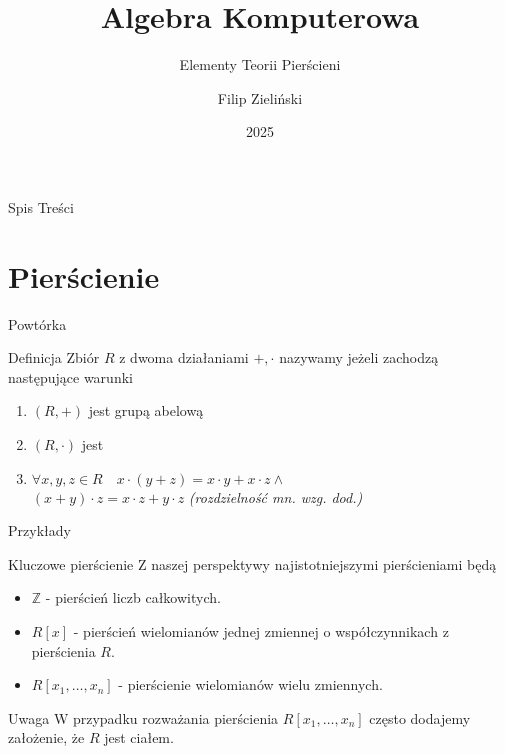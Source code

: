 \documentclass{beamer}
\title{Algebra Komputerowa}
\subtitle{Elementy Teorii Pierścieni}
\author{Filip Zieli\'nski}
\date{2025}
\begin{document}
\begin{frame}
    \titlepage
\end{frame}
 
\begin{frame}{Spis Treści}
    \tableofcontents
\end{frame}

\section{Pierścienie}
\begin{frame}{Powtórka}
    \begin{block}{Definicja}
        Zbiór $R$ z dwoma działaniami $+, \cdot$ nazywamy    jeżeli zachodzą następujące warunki
        \begin{enumerate}
            \item $(R, +)$ jest grupą abelową 
            \item $(R, \cdot)$ jest   
            \item $\forall x,y,z \in R \quad x \cdot (y + z) = x \cdot y + x \cdot z \land $ \\ $(x + y) \cdot z = x \cdot z + y \cdot z$ \hfill \textit{(rozdzielność mn. wzg. dod.)} 
        \end{enumerate}
    \end{block}
\end{frame}

\begin{frame}{Przykłady}
    \begin{exampleblock}{Kluczowe pierścienie}
        Z naszej perspektywy najistotniejszymi pierścieniami będą
        \begin{itemize}
            \item $\mathbb{Z}$ - pierścień liczb całkowitych.
            \item $R[x]$ - pierścień wielomianów jednej zmiennej o współczynnikach z pierścienia $R$.
            \item $R[x_1, \ldots , x_n]$ - pierścienie wielomianów wielu zmiennych.
        \end{itemize}
    \end{exampleblock}
    \pause 
    \begin{alertblock}{Uwaga}
        W przypadku rozważania pierścienia $R[x_1, \ldots, x_n]$ często dodajemy założenie, że $R$ jest ciałem. 
    \end{alertblock}
\end{frame}
\end{document}
